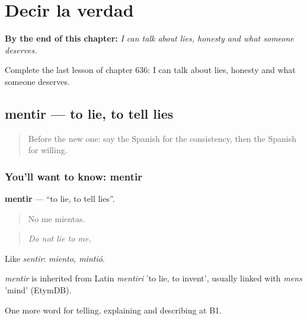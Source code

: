 
\chapter{Decir la verdad}
\label{ch:es-decir-la-verdad}

\begin{chapteropening}
\textbf{By the end of this chapter:} \emph{I can talk about lies, honesty and what someone deserves.}

Complete the last lesson of chapter 636: I can talk about lies, honesty and what someone deserves.
\end{chapteropening}

\section[mentir]{mentir — to lie, to tell lies}

\label{lesson:ES-C636-mentir}



\begin{quote}
Before the new one: say the Spanish for the consistency, then the Spanish for willing.
\end{quote}

\subsection*{You'll want to know: mentir}
\textbf{mentir} — \textquotedblleft{}to lie, to tell lies\textquotedblright{}.

\begin{quote}
No me mientas.
\end{quote}

\begin{quote}
\emph{Do not lie to me.}
\end{quote}

Like \emph{sentir}: \emph{miento, mintió}.

\begin{cousinweb}
\emph{mentir} is inherited from Latin \emph{mentiri} 'to lie, to invent', usually linked with \emph{mens} 'mind' (EtymDB).
\end{cousinweb}

\begin{grammarlens}[title={What you've built}]
One more word for telling, explaining and describing at B1.
\end{grammarlens}

